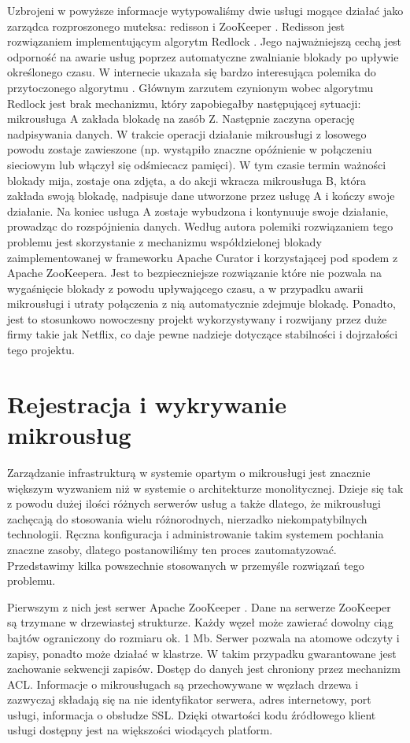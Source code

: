 \documentclass[licencjacka]{pracamgr}
\begin{document}
Uzbrojeni w powyższe informacje wytypowaliśmy dwie usługi mogące działać jako zarządca rozproszonego muteksa:
redisson \cite{redisson} i ZooKeeper \cite{zookeeper}. Redisson jest rozwiązaniem implementującym algorytm Redlock
\cite{redislock}. Jego najważniejszą cechą jest odporność na awarie usług poprzez automatyczne zwalnianie blokady
po upływie określonego czasu. W internecie ukazała się bardzo interesująca polemika do przytoczonego algorytmu \cite{redisbad}.
Głównym zarzutem czynionym wobec algorytmu Redlock jest brak mechanizmu, który zapobiegałby następującej sytuacji:
mikrousługa A zakłada blokadę na zasób Z. Następnie zaczyna operację nadpisywania danych. W trakcie operacji
działanie mikrousługi z losowego powodu zostaje zawieszone (np. wystąpiło znaczne opóźnienie w połączeniu sieciowym
lub włączył się odśmiecacz pamięci). W tym czasie termin ważności blokady mija, zostaje ona zdjęta, a do akcji
wkracza mikrousługa B, która zakłada swoją blokadę, nadpisuje dane utworzone przez usługę A i kończy swoje
działanie. Na koniec usługa A zostaje wybudzona i kontynuuje swoje działanie, prowadząc do rozspójnienia danych.
Według autora polemiki rozwiązaniem tego problemu jest skorzystanie z mechanizmu współdzielonej blokady
zaimplementowanej w frameworku Apache Curator \cite{curatorlock} i korzystającej pod spodem z Apache ZooKeepera.
Jest to bezpieczniejsze rozwiązanie które nie pozwala na wygaśnięcie blokady z powodu upływającego
czasu, a w przypadku awarii mikrousługi i utraty połączenia z nią
automatycznie zdejmuje blokadę. Ponadto, jest to stosunkowo nowoczesny projekt wykorzystywany i rozwijany przez
duże firmy takie jak Netflix, co daje pewne nadzieje dotyczące stabilności i dojrzałości tego projektu.

\section{Rejestracja i wykrywanie mikrousług}

Zarządzanie infrastrukturą w systemie opartym o mikrousługi jest znacznie większym
wyzwaniem niż w systemie o architekturze monolitycznej. Dzieje się tak z powodu
dużej ilości różnych serwerów usług a także dlatego, że mikrousługi zachęcają do
stosowania wielu różnorodnych, nierzadko niekompatybilnych technologii. Ręczna
konfiguracja i administrowanie takim systemem pochłania znaczne zasoby, dlatego
postanowiliśmy ten proces zautomatyzować. Przedstawimy kilka powszechnie stosowanych
w przemyśle rozwiązań tego problemu.

Pierwszym z nich jest serwer Apache ZooKeeper \cite{zookeeper}. Dane na serwerze
ZooKeeper są trzymane w drzewiastej strukturze. Każdy węzeł może zawierać dowolny
ciąg bajtów ograniczony do rozmiaru ok. 1 Mb. Serwer pozwala na atomowe odczyty i
zapisy, ponadto może działać w klastrze. W takim przypadku gwarantowane jest zachowanie
sekwencji zapisów. Dostęp do danych jest chroniony przez mechanizm ACL.
Informacje o mikrousługach są przechowywane w węzłach drzewa i zazwyczaj składają
się na nie identyfikator serwera, adres internetowy, port usługi, informacja o
obsłudze SSL. Dzięki otwartości kodu źródłowego klient usługi dostępny jest na
większości wiodących platform.
\end{document}
